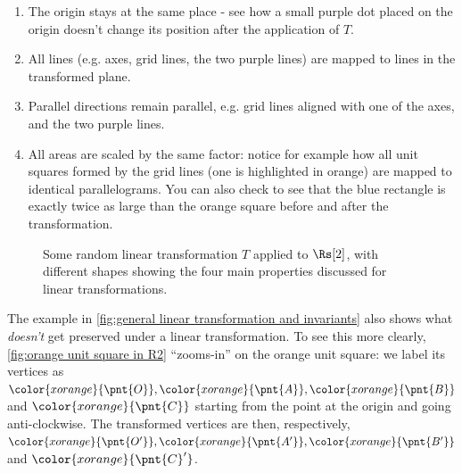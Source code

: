 \begin{enumerate}
	\item The origin stays at the same place - see how a small purple dot placed on the origin doesn't change its position after the application of $T$.
	\item All lines (e.g. axes, grid lines, the two purple lines) are mapped to lines in the transformed plane.
	\item Parallel directions remain parallel, e.g. grid lines aligned with one of the axes, and the two purple lines.
	\item All areas are scaled by the same factor: notice for example how all unit squares formed by the grid lines (one is highlighted in orange) are mapped to identical parallelograms. You can also check to see that the blue rectangle is exactly twice as large than the orange square before and after the transformation.
\end{enumerate}

\begin{figure}
	\begin{center}
	\end{center}
	\caption{Some random linear transformation $T$ applied to $\Rs[2]$, with different shapes showing the four main properties discussed for linear transformations.}
	\label{fig:general linear transformation and invariants}
\end{figure}

The example in \autoref{fig:general linear transformation and invariants} also shows what \textit{doesn't} get preserved under a linear transformation. To see this more clearly, \autoref{fig:orange unit square in R2}  \enquote{zooms-in} on the orange unit square: we label its vertices as $\color{xorange}{\pnt{O}}, \color{xorange}{\pnt{A}}, \color{xorange}{\pnt{B}}$ and $\color{xorange}{\pnt{C}}$ starting from the point at the origin and going anti-clockwise. The transformed vertices are then, respectively, $\color{xorange}{\pnt{O'}}, \color{xorange}{\pnt{A'}}, \color{xorange}{\pnt{B'}}$ and $\color{xorange}{\pnt{C}'}$.

